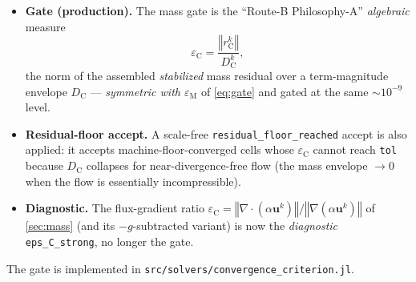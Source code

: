 \documentclass[11pt]{article}
\newcommand{\bu}{\boldsymbol{u}}
\newcommand{\grad}{\nabla}
\newcommand{\divg}{\nabla\!\cdot\!}
\newcommand{\norm}[1]{\left\Vert #1\right\Vert}
\newcommand{\rC}{r_{\mathrm C}}
\newcommand{\DC}{D_{\mathrm C}}
\newcommand{\epsM}{\varepsilon_{\mathrm M}}
\newcommand{\epsC}{\varepsilon_{\mathrm C}}
\theoremstyle{plain}
\theoremstyle{remark}
\begin{document}
\begin{itemize}
  \item \textbf{Gate (production).} The mass gate is the ``Route-B
    Philosophy-A'' \emph{algebraic} measure
    \begin{equation}\label{eq:algC}
      \epsC=\frac{\norm{\rC^k}}{\DC^k},
    \end{equation}
    the norm of the assembled \emph{stabilized} mass residual over a
    term-magnitude envelope $\DC$ --- \emph{symmetric with $\epsM$} of
    \cref{eq:gate} and gated at the same $\sim10^{-9}$ level.
  \item \textbf{Residual-floor accept.} A scale-free
    \texttt{residual\_floor\_reached} accept is also applied: it accepts
    machine-floor-converged cells whose $\epsC$ cannot reach \texttt{tol} because
    $\DC$ collapses for near-divergence-free flow (the mass envelope $\to0$ when
    the flow is essentially incompressible).
  \item \textbf{Diagnostic.} The flux-gradient ratio
    $\epsC=\norm{\divg(\alpha\bu^k)}/\norm{\grad(\alpha\bu^k)}$ of
    \cref{sec:mass} (and its $-g$-subtracted variant) is now the \emph{diagnostic}
    \texttt{eps\_C\_strong}, no longer the gate.
\end{itemize}

The gate is implemented in
\texttt{src/solvers/convergence\_criterion.jl}.
\end{document}
